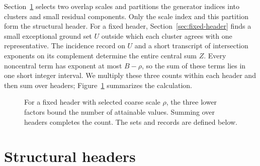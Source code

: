 \documentclass[11pt]{article}
\theoremstyle{definition}
\theoremstyle{remark}
\begin{document}
Section~\ref{sec:headers} selects two overlap scales and partitions the
generator indices into clusters and small residual components. Only the
scale index and this partition form the structural header. For a fixed
header, Section~\ref{sec:fixed-header} finds a small exceptional ground set
$U$ outside which each cluster agrees with one representative. The incidence
record on $U$ and a short transcript of intersection exponents on its
complement determine the entire central sum $Z$. Every noncentral term has
exponent at most $B-\rho$, so the sum of these terms lies in one short
integer interval. We multiply these three counts within each header and
then sum over headers; Figure~\ref{fig:counting-scheme} summarizes the
calculation.

\begin{figure}[htbp]
\centering
{}
\caption{For a fixed header with selected coarse scale $\rho$, the three
lower factors bound the number of attainable values. Summing over headers
completes the count. The sets and records are defined below.}
\label{fig:counting-scheme}
\end{figure}

\section{Structural headers}\label{sec:headers}
\end{document}
